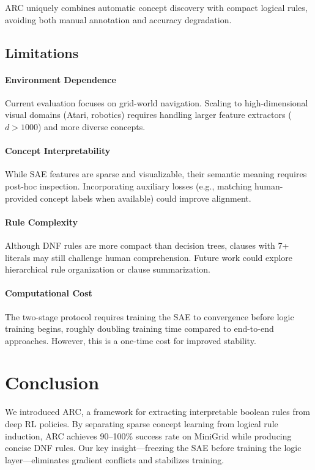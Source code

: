 \documentclass[11pt,twocolumn]{article}
\begin{document}
ARC uniquely combines automatic concept discovery with compact logical rules, avoiding both manual annotation and accuracy degradation.

\subsection{Limitations}

\paragraph{Environment Dependence} Current evaluation focuses on grid-world navigation. Scaling to high-dimensional visual domains (Atari, robotics) requires handling larger feature extractors ($d > 1000$) and more diverse concepts.

\paragraph{Concept Interpretability} While SAE features are sparse and visualizable, their semantic meaning requires post-hoc inspection. Incorporating auxiliary losses (e.g., matching human-provided concept labels when available) could improve alignment.

\paragraph{Rule Complexity} Although DNF rules are more compact than decision trees, clauses with 7+ literals may still challenge human comprehension. Future work could explore hierarchical rule organization or clause summarization.

\paragraph{Computational Cost} The two-stage protocol requires training the SAE to convergence before logic training begins, roughly doubling training time compared to end-to-end approaches. However, this is a one-time cost for improved stability.

\section{Conclusion}

We introduced ARC, a framework for extracting interpretable boolean rules from deep RL policies. By separating sparse concept learning from logical rule induction, ARC achieves 90--100\% success rate on MiniGrid while producing concise DNF rules. Our key insight—freezing the SAE before training the logic layer—eliminates gradient conflicts and stabilizes training.
\end{document}
